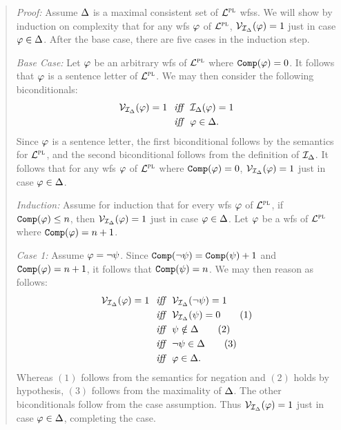 \begin{quote} 
  \textit{Proof:} 
  Assume $\Delta$ is a maximal consistent set of $\mathcal{L}^{\textsc{pl}}$ wfss.
  We will show by induction on complexity that for any wfs $\varphi$ of $\mathcal{L}^{\textsc{pl}}$, $\mathcal{V}_{\mathcal{I}_{\Delta}}(\varphi) = 1$ just in case $\varphi\in\Delta$.
  After the base case, there are five cases in the induction step.

  \textit{Base Case:} 
  Let $\varphi$ be an arbitrary wfs of $\mathcal{L}^{\textsc{pl}}$ where $\texttt{Comp}(\varphi)=0$.
  It follows that $\varphi$ is a sentence letter of $\mathcal{L}^{\textsc{pl}}$.
  We may then consider the following biconditionals:
  \begin{align*}
    \mathcal{V}_{\mathcal{I}_{\Delta}}(\varphi)=1 
      &\textit{ ~iff~ } \mathcal{I}_{\Delta}(\varphi) = 1\\
      &\textit{ ~iff~ } \varphi \in \Delta.
  \end{align*}
  Since $\varphi$ is a sentence letter, the first biconditional follows by the semantics for $\mathcal{L}^{\textsc{pl}}$, and the second biconditional follows from the definition of $\mathcal{I}_{\Delta}$.
  It follows that for any wfs $\varphi$ of $\mathcal{L}^{\textsc{pl}}$ where $\texttt{Comp}(\varphi) = 0$, $\mathcal{V}_{\mathcal{I}_{\Delta}}(\varphi) = 1$ just in case $\varphi\in\Delta$.

  \textit{Induction:}
  Assume for induction that for every wfs $\varphi$ of $\mathcal{L}^{\textsc{pl}}$, if $\texttt{Comp}(\varphi)\leq n$, then $\mathcal{V}_{\mathcal{I}_{\Delta}}(\varphi) = 1$ just in case $\varphi\in\Delta$. 
  Let $\varphi$ be a wfs of $\mathcal{L}^{\textsc{pl}}$ where $\texttt{Comp}(\varphi)=n+1$.

  \textit{Case 1:}
  Assume $\varphi=\neg \psi$.
  Since $\texttt{Comp}(\neg \psi)=\texttt{Comp}(\psi)+1$ and $\texttt{Comp}(\varphi)=n+1$, it follows that $\texttt{Comp}(\psi)=n$.
  We may then reason as follows:
  \begin{align*}
    \mathcal{V}_{\mathcal{I}_{\Delta}}(\varphi) = 1 &\textit{ ~iff~ } \mathcal{V}_{\mathcal{I}_{\Delta}}(\neg \psi) = 1\\
      &\textit{ ~iff~ } \mathcal{V}_{\mathcal{I}_{\Delta}}(\psi) = 0   \tag{1} \\
      &\textit{ ~iff~ } \psi \notin \Delta        \tag{2} \\
      &\textit{ ~iff~ } \neg \psi \in \Delta     \tag{3} \\
      &\textit{ ~iff~ } \varphi \in \Delta.
  \end{align*}
  Whereas $(1)$ follows from the semantics for negation and $(2)$ holds by hypothesis, $(3)$ follows from the maximality of $\Delta$. %
  The other biconditionals follow from the case assumption.
  Thus $\mathcal{V}_{\mathcal{I}_{\Delta}}(\varphi) = 1$ just in case $\varphi\in\Delta$, completing the case.


\end{quote}
